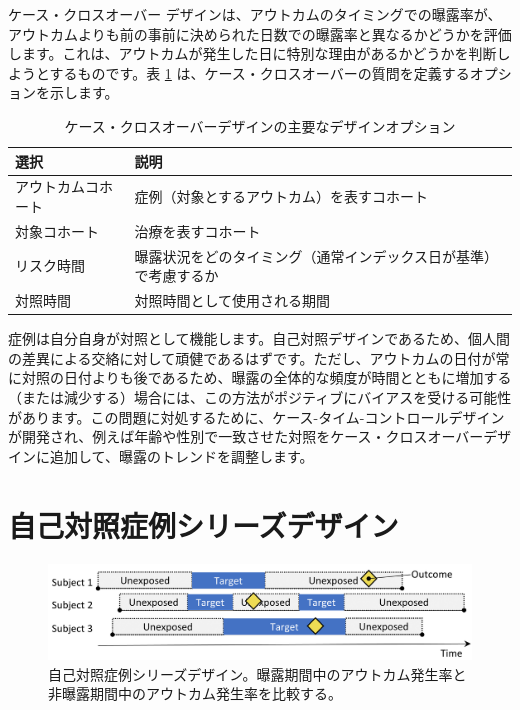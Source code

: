 \documentclass[
  11pt]{book}
\theoremstyle{definition}
\theoremstyle{definition}
\theoremstyle{definition}
\theoremstyle{definition}
\theoremstyle{remark}
\begin{document}
ケース・クロスオーバー \citep{maclure_1991} デザインは、アウトカムのタイミングでの曝露率が、アウトカムよりも前の事前に決められた日数での曝露率と異なるかどうかを評価します。これは、アウトカムが発生した日に特別な理由があるかどうかを判断しようとするものです。表 \ref{tab:ccrChoices} は、ケース・クロスオーバーの質問を定義するオプションを示します。  

\begin{table}
\centering
\caption{\label{tab:ccrChoices}ケース・クロスオーバーデザインの主要なデザインオプション}
\centering
\begin{tabular}[t]{l>{\raggedright\arraybackslash}p{9cm}}
\toprule
選択 & 説明\\
\midrule
アウトカムコホート & 症例（対象とするアウトカム）を表すコホート\\
対象コホート & 治療を表すコホート\\
リスク時間 & 曝露状況をどのタイミング（通常インデックス日が基準）で考慮するか\\
対照時間 & 対照時間として使用される期間\\
\bottomrule
\end{tabular}
\end{table}

症例は自分自身が対照として機能します。自己対照デザインであるため、個人間の差異による交絡に対して頑健であるはずです。ただし、アウトカムの日付が常に対照の日付よりも後であるため、曝露の全体的な頻度が時間とともに増加する（または減少する）場合には、この方法がポジティブにバイアスを受ける可能性があります。この問題に対処するために、ケース-タイム-コントロールデザイン \citep{suissa_1995} が開発され、例えば年齢や性別で一致させた対照をケース・クロスオーバーデザインに追加して、曝露のトレンドを調整します。

\section{自己対照症例シリーズデザイン}\label{ux81eaux5df1ux5bfeux7167ux75c7ux4f8bux30b7ux30eaux30fcux30baux30c7ux30b6ux30a4ux30f3}


\begin{figure}[h]

{\centering \includegraphics[width=0.9\linewidth]{images/PopulationLevelEstimation/selfControlledCaseSeries} 

}

\caption{自己対照症例シリーズデザイン。曝露期間中のアウトカム発生率と非曝露期間中のアウトカム発生率を比較する。}\label{fig:selfControlledCaseSeries}
\end{figure}
\end{document}
